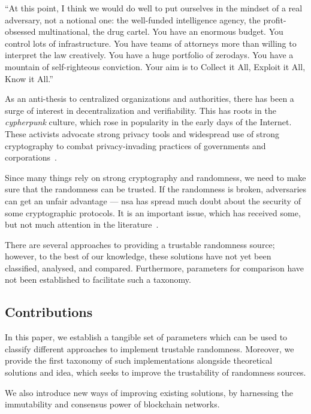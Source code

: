 \begin{displayquote}
    \enquote{At this point, I think we would do well to put ourselves in the mindset of a real adversary, not a notional one:
    the well-funded intelligence agency, the profit-obsessed multinational, the drug cartel.
    You have an enormous budget. You control lots of infrastructure.
    You have teams of attorneys more than willing to interpret the law creatively.
    You have a huge portfolio of zerodays. You have a mountain of self-righteous conviction.
    Your aim is to Collect it All, Exploit it All, Know it All.}
\end{displayquote}

As an anti-thesis to centralized organizations and authorities, there has been a surge of interest in decentralization and verifiability. This has roots in the \emph{cypherpunk} culture, which rose in popularity in the early days of the Internet.
These activists advocate strong privacy tools and widespread use of strong cryptography to combat privacy-invading practices of governments and corporations~\cite{hughes1993cypherpunk}.

Since many things rely on strong cryptography and randomness, we need to make sure that the randomness can be trusted. If the randomness is broken, adversaries can get an unfair advantage --- \gls{nsa} has spread much doubt about the security of some cryptographic protocols. It is an important issue, which has received some, but not much attention in the literature~\cite{lenstra2015random}.

There are several approaches to providing a trustable randomness source; however, to the best of our knowledge, these solutions have not yet been classified, analysed, and compared.
Furthermore, parameters for comparison have not been established to facilitate such a taxonomy.

\subsection*{Contributions}\label{subsec:contributions}
In this paper, we establish a tangible set of parameters which can be used to classify different approaches to implement trustable randomness.
Moreover, we provide the first taxonomy of such implementations alongside theoretical solutions and idea, which seeks to improve the trustability of randomness sources.

We also introduce new ways of improving existing solutions, by harnessing the immutability and consensus power of blockchain networks.

